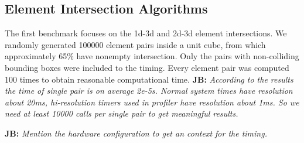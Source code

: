 \documentclass{elsarticle}
\newcommand{\figpath}{figures/}
\newcommand{\noteJB}[1]{{\color{Blue} \textbf{JB: } \textit{#1}}}
\newcommand{\notePE}[1]{{\color{Orange} \textbf{PE: } \textit{#1}}}
\newcommand{\plucker}{Pl\"{u}cker }
\newcommand{\ngh}{NGH }
\begin{document}
\subsection{Element Intersection Algorithms}
The first benchmark focuses on the 1d-3d and 2d-3d element intersections. We randomly generated
100000 element pairs inside a unit cube, from which approximately 65\% have nonempty intersection.
Only the pairs with non-colliding bounding boxes were included to the timing.  
Every element pair was computed 100 times to obtain reasonable computational time.
\noteJB{According to the results the time of single pair is on average 2e-5s. Normal system times have resolution about 20ms, hi-resolution timers
used in profiler have resolution about 1ms. So we need at least 10000 calls per single pair to get meaningful results.}

\noteJB{Mention the hardware configuration to get an context for the timing.}

%     
\end{document}
